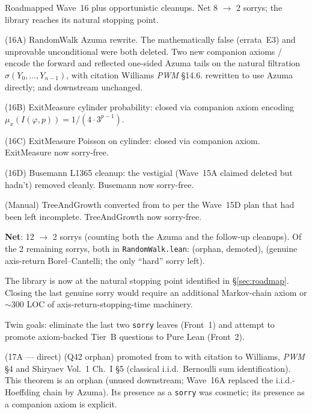 \documentclass[11pt,a4paper]{article}
\newcommand{\cmd}[1]{\texttt{\small #1}}
\newcommand{\lmod}[1]{\texttt{\small #1}}
\theoremstyle{plain}
\theoremstyle{definition}
\begin{document}
Roadmapped Wave~16 plus opportunistic cleanups. Net 8 $\to$ 2
sorrys; the library reaches its natural stopping point.

(16A) RandomWalk Azuma rewrite. The mathematically false
 (errata~E3) and unprovable
unconditional  were both deleted.
Two new companion axioms  /
 encode the forward and reflected one-sided Azuma
tails on the natural filtration $\sigma(Y_0, \ldots, Y_{n-1})$,
with citation Williams \emph{PWM} \S14.6.
 rewritten to use Azuma directly;
 and downstream unchanged.

(16B) ExitMeasure cylinder probability:
 closed via companion
axiom encoding $\mu_x(I(\varphi, p)) = 1/(4 \cdot 3^{p-1})$.

(16C) ExitMeasure Poisson on cylinder:
 closed via
companion axiom. ExitMeasure now sorry-free.

(16D) Busemann L1365 cleanup: the vestigial
 (Wave~15A claimed deleted but
hadn't) removed cleanly. Busemann now sorry-free.

(Manual) TreeAndGrowth  converted from
 to  per the Wave~15D plan
that had been left incomplete. TreeAndGrowth now sorry-free.

\textbf{Net}: 12 $\to$ 2 sorrys (counting both the Azuma and the
follow-up cleanups). Of the 2 remaining sorrys, both in
\lmod{RandomWalk.lean}: 
(orphan, demoted),  (genuine
axis-return Borel--Cantelli; the only ``hard'' sorry left).

The library is now at the natural stopping point identified in
\S\ref{sec:roadmap}. Closing the last genuine sorry would require
an additional Markov-chain axiom or $\sim$300 LOC of
axis-return-stopping-time machinery.

Twin goals: eliminate the last two \cmd{sorry} leaves (Front~1) and
attempt to promote axiom-backed Tier~B questions to Pure Lean (Front~2).

(17A --- direct)  (Q42 orphan) promoted
from  to  with citation to
Williams, \emph{PWM} \S4 and Shiryaev Vol.~1 Ch.~I \S5 (classical
i.i.d.\ Bernoulli sum identification). This theorem is an orphan
(unused downstream; Wave~16A replaced the i.i.d.-Hoeffding chain by
Azuma). Its presence as a \cmd{sorry} was cosmetic; its presence as a
companion axiom is explicit.
\end{document}

